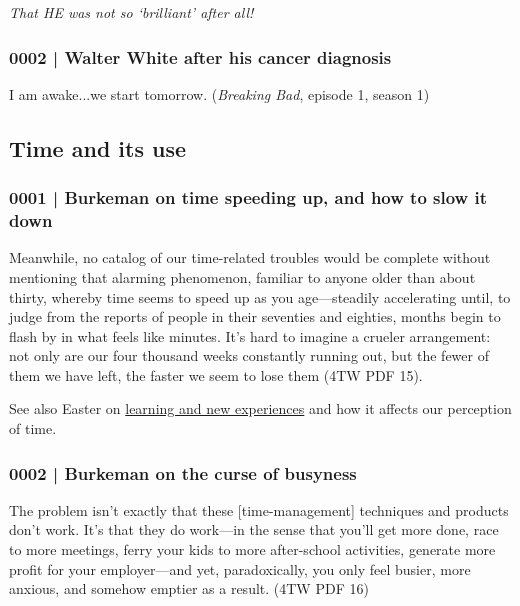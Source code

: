			\textit{That HE was not so `brilliant' after all!}
		
		\subsubsection{0002 | Walter White after his cancer diagnosis}
			\label{GM-LIFE-ENERGY-0002}
			
			I am awake...we start tomorrow. (\textit{Breaking Bad}, episode 1, season 1)
			
	\subsection{Time and its use} %
		\label{GM-LIFE-TIME}
			
		\subsubsection{0001 | Burkeman on time speeding up, and how to slow it down}
			\label{GM-LIFE-TIME-0001}
			
			Meanwhile, no catalog of our time-related troubles would be complete without mentioning that alarming phenomenon, familiar to anyone older than about thirty, whereby time seems to speed up as you age---steadily accelerating until, to judge from the reports of people in their seventies and eighties, months begin to flash by in what feels like minutes. It's hard to imagine a crueler arrangement: not only are our four thousand weeks constantly running out, but the fewer of them we have left, the faster we seem to lose them (4TW PDF 15).
				\begin{compactitem}
					\item See also Easter on \hyperref[GM-LIFE-TIME-0006]{learning and new experiences} and how it affects our perception of time.
				\end{compactitem}
			
		\subsubsection{0002 | Burkeman on the curse of busyness}
			\label{GM-LIFE-TIME-0002}
			
			The problem isn't exactly that these [time-management] techniques and products don't work. It's that they do work---in the sense that you'll get more done, race to more meetings, ferry your kids to more after-school activities, generate more profit for your employer---and yet, paradoxically, you only feel busier, more anxious, and somehow emptier as a result. (4TW PDF 16)
			
